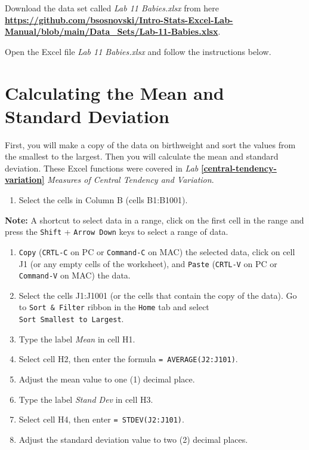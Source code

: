 \documentclass[
]{book}
\providecommand{\tightlist}{%
  \setlength{\itemsep}{0pt}\setlength{\parskip}{0pt}}
\begin{document}
Download the data set called \emph{Lab 11 Babies.xlsx} from here \href{https://github.com/bsosnovski/Intro-Stats-Excel-Lab-Manual/blob/main/Data_Sets/Lab-11-Babies.xlsx}{\textbf{https://github.com/bsosnovski/Intro-Stats-Excel-Lab-Manual/blob/main/Data\_Sets/Lab-11-Babies.xlsx}}.

Open the Excel file \emph{Lab 11 Babies.xlsx} and follow the instructions below.

\hypertarget{calculating-the-mean-and-standard-deviation}{%
\section{Calculating the Mean and Standard Deviation}\label{calculating-the-mean-and-standard-deviation}}

First, you will make a copy of the data on birthweight and sort the values from the smallest to the largest. Then you will calculate the mean and standard deviation. These Excel functions were covered in \emph{Lab} \textbf{\ref{central-tendency-variation}} \emph{Measures of Central Tendency and Variation}.

\begin{enumerate}
\def\labelenumi{\arabic{enumi}.}
\tightlist
\item
  Select the cells in Column B (cells B1:B1001).
\end{enumerate}

\textbf{Note:} A shortcut to select data in a range, click on the first cell in the range and press the \texttt{Shift} + \texttt{Arrow\ Down} keys to select a range of data.

\begin{enumerate}
\def\labelenumi{\arabic{enumi}.}
\setcounter{enumi}{1}
\tightlist
\item
  \texttt{Copy} (\texttt{CRTL-C} on PC or \texttt{Command-C} on MAC) the selected data, click on cell J1 (or any empty cells of the worksheet), and \texttt{Paste} (\texttt{CRTL-V} on PC or \texttt{Command-V} on MAC) the data.
\item
  Select the cells J1:J1001 (or the cells that contain the copy of the data). Go to \texttt{Sort\ \&\ Filter} ribbon in the \texttt{Home} tab and select \texttt{Sort\ Smallest\ to\ Largest}.
\item
  Type the label \emph{Mean} in cell H1.
\item
  Select cell H2, then enter the formula \texttt{=\ AVERAGE(J2:J101)}.
\item
  Adjust the mean value to one (1) decimal place.
\item
  Type the label \emph{Stand Dev} in cell H3.
\item
  Select cell H4, then enter \texttt{=\ STDEV(J2:J101)}.
\item
  Adjust the standard deviation value to two (2) decimal places.
\end{enumerate}
\end{document}
